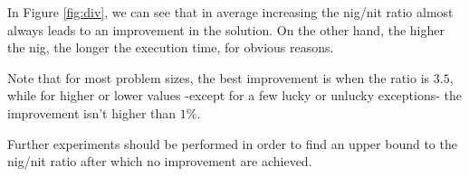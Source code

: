 \documentclass{article}
\begin{document}
In Figure \ref{fig:div}, we can see that in average increasing the nig/nit ratio almost always leads to an improvement in the solution.
On the other hand, the higher the nig, the longer the execution time, for obvious reasons.

Note that for most problem sizes, the best improvement is when the ratio is $3.5$, while for higher or lower values -except for a few lucky or unlucky exceptions- the improvement isn't higher than $1\%$.

Further experiments should be performed in order to find an upper bound to the nig/nit ratio after which no improvement are achieved.

\printbibliography
\end{document}

